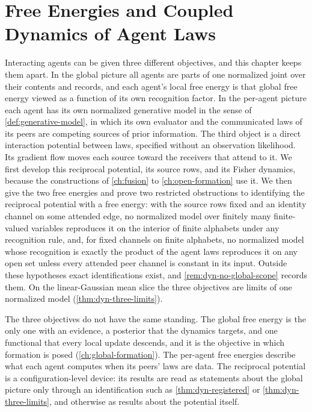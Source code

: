 \chapter{Free Energies and Coupled Dynamics of Agent Laws}
\label{ch:dynamics}

Interacting agents can be given three different objectives, and this chapter keeps them apart. In the global picture all agents are parts of one normalized joint over their contents and records, and each agent's local free energy is that global free energy viewed as a function of its own recognition factor. In the per-agent picture each agent has its own normalized generative model in the sense of \cref{def:generative-model}, in which its own evaluator and the communicated laws of its peers are competing sources of prior information. The third object is a direct interaction potential between laws, specified without an observation likelihood. Its gradient flow moves each source toward the receivers that attend to it. We first develop this reciprocal potential, its source rows, and its Fisher dynamics, because the constructions of \cref{ch:fusion} to \cref{ch:open-formation} use it. We then give the two free energies and prove two restricted obstructions to identifying the reciprocal potential with a free energy: with the source rows fixed and an identity channel on some attended edge, no normalized model over finitely many finite-valued variables reproduces it on the interior of finite alphabets under any recognition rule, and, for fixed channels on finite alphabets, no normalized model whose recognition is exactly the product of the agent laws reproduces it on any open set unless every attended peer channel is constant in its input. Outside these hypotheses exact identifications exist, and \cref{rem:dyn-no-global-scope} records them. On the linear-Gaussian mean slice the three objectives are limits of one normalized model (\cref{thm:dyn-three-limits}).

The three objectives do not have the same standing. The global free energy is the only one with an evidence, a posterior that the dynamics targets, and one functional that every local update descends, and it is the objective in which formation is posed (\cref{ch:global-formation}). The per-agent free energies describe what each agent computes when its peers' laws are data. The reciprocal potential is a configuration-level device: its results are read as statements about the global picture only through an identification such as \cref{thm:dyn-registered} or \cref{thm:dyn-three-limits}, and otherwise as results about the potential itself.

